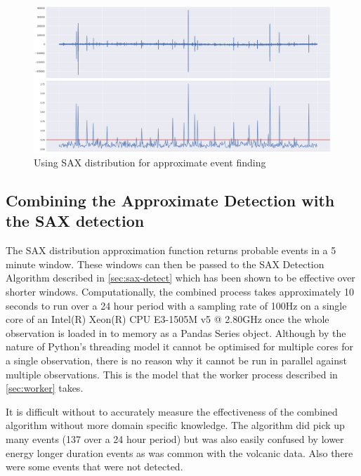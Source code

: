 \documentclass[../report.tex]{subfiles}
\begin{document}
\begin{figure}[H]
	\centering
	\includegraphics[width=1\linewidth]{img/dist_test}
	\caption{Using SAX distribution for approximate event finding}
	\label{fig:disttest}
\end{figure}

\subsection{Combining the Approximate Detection with the SAX detection} \label{sec:sax-combined}

	The SAX distribution approximation function returns probable events in a 5 minute window.  These windows can then be passed to the SAX Detection Algorithm described in \cref{sec:sax-detect} which has been shown to be effective over shorter windows.  Computationally, the combined process takes approximately 10 seconds to run over a 24 hour period with a sampling rate of 100Hz on a single core of an Intel(R) Xeon(R) CPU E3-1505M v5 @ 2.80GHz once the whole observation is loaded in to memory as a Pandas Series object.  Although by the nature of Python's threading model it cannot be optimised for multiple cores for a single observation, there is no reason why it cannot be run in parallel against multiple observations.  This is the model that the worker process described in \cref{sec:worker} takes.

	It is difficult without to accurately measure the effectiveness of the combined algorithm without more domain specific knowledge.  The algorithm did pick up many events (137 over a 24 hour period) but was also easily confused by lower energy longer duration events as was common with the volcanic data.  Also there were some events that were not detected.
	
\end{document}
